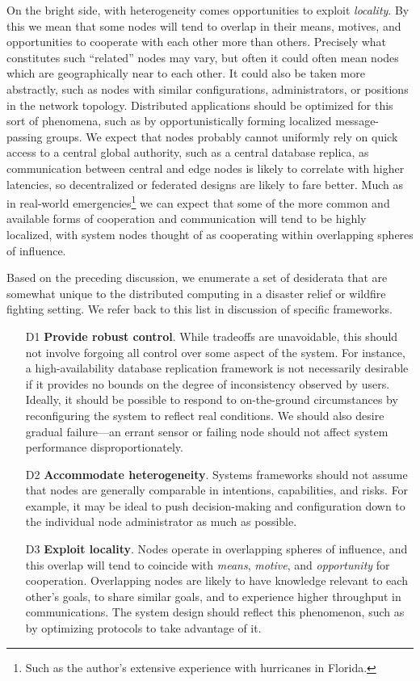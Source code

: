 On the bright side, with heterogeneity comes opportunities to exploit
\emph{locality}. By this we mean that some nodes will tend to overlap in their
means, motives, and opportunities to cooperate with each other more than others.
Precisely what constitutes such ``related'' nodes may vary, but often it could
often mean nodes which are geographically near to each other. It could also be
taken more abstractly, such as nodes with similar configurations,
administrators, or positions in the network topology. Distributed applications
should be optimized for this sort of phenomena, such as by opportunistically
forming localized message-passing groups. We expect that nodes probably cannot
uniformly rely on quick access to a central global authority, such as a central
database replica, as communication between central and edge nodes is likely to
correlate with higher latencies, so decentralized or federated designs are
likely to fare better. Much as in real-world emergencies\footnote{Such as the
	author's extensive experience with hurricanes in Florida.} we can expect that
some of the more common and available forms of cooperation and communication
will tend to be highly localized, with system nodes thought of as cooperating
within overlapping spheres of influence.

Based on the preceding discussion, we enumerate a set of desiderata that are
somewhat unique to the distributed computing in a disaster relief or wildfire
fighting setting. We refer back to this list in discussion of specific
frameworks.

\begin{enumerate}
	\item[D1] \textbf{Provide robust control}. While tradeoffs are
	unavoidable, this should not involve forgoing all control over some
	aspect of the system. For instance, a high-availability database
	replication framework is not necessarily desirable if it provides no
	bounds on the degree of inconsistency observed by users. Ideally, it
	should be possible to respond to on-the-ground circumstances by
	reconfiguring the system to reflect real conditions. We should also
	desire gradual failure---an errant sensor or failing node should not
	affect system performance disproportionately.
	\item[D2] \textbf{Accommodate heterogeneity}. Systems frameworks should
	not assume that nodes are generally comparable in intentions,
	capabilities, and risks. For example, it may be ideal to push
	decision-making and configuration down to the individual node
	administrator as much as possible.
	\item[D3] \textbf{Exploit locality}. Nodes operate in overlapping
	spheres of influence, and this overlap will tend to coincide with
	\emph{means}, \emph{motive}, and \emph{opportunity} for cooperation.
	Overlapping nodes are likely to have knowledge relevant to each other's
	goals, to share similar goals, and to experience higher throughput in
	communications. The system design should reflect this phenomenon, such
	as by optimizing protocols to take advantage of it.
\end{enumerate}

